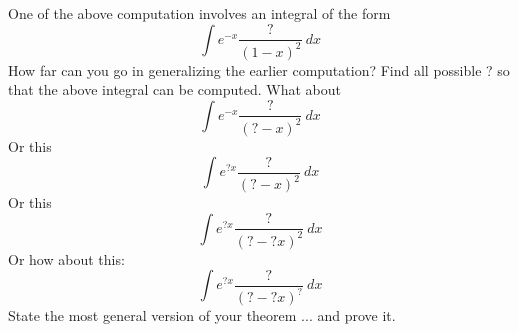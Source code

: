   One of the above computation involves an integral of the form
  \[
  \int e^{-x} \frac{\text{?}}{(1-x)^2} \ dx
  \]
  How far can you go in generalizing the earlier computation?
  Find all possible ? so that the above integral
  can be computed.
  What about
  \[
  \int e^{-x} \frac{\text{?}}{(?-x)^2} \ dx
  \]
  Or this
  \[
  \int e^{?x} \frac{\text{?}}{(?-x)^2} \ dx
  \]
  Or this
  \[
  \int e^{?x} \frac{\text{?}}{(?-?x)^2} \ dx
  \]
  Or how about this:
  \[
  \int e^{?x} \frac{\text{?}}{(?-?x)^?} \ dx
  \]
  State the most general version of your theorem ... and prove it.
